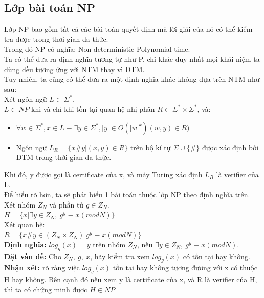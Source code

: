 \documentclass[a4paper 14pt]{article}
\begin{document}
		\subsection{Lớp bài toán NP}
			Lớp NP bao gồm tất cả các bài toán quyết định mà lời giải của nó có thể kiểm tra được trong thơi gian đa thức.\\
			Trong đó NP có nghĩa: Non-deterministic Polynomial time.\\
			Ta có thể đưa ra định nghĩa tương tự như P, chỉ khác duy nhất mọi khái niệm ta dùng đều tương ứng với NTM thay vì DTM.\\
			Tuy nhiên, ta cũng có thể đưa ra một định nghĩa khác không dựa trên NTM như sau:\\
			Xét ngôn ngữ $L \subset \Sigma^{*}$.\\
			$L \subset NP$ khi và chỉ khi tồn tại quan hệ nhị phân $R \subset \Sigma^{*} \times \Sigma^{*}$, và:
			\begin{itemize}
				\item $\forall w \in \Sigma^{*}, x \in L \equiv \exists y \in \Sigma^{*}, |y| \in O(|w|^k) (w,y) \in R)$
				\item Ngôn ngữ $L_R = \{x\#y| (x,y) \in R\}$ trên bộ kí tự $\Sigma \cup \{\#\}$ được xác định bởi DTM trong thời gian đa thức.
			\end{itemize}
			Khi đó, y được gọi là certificate của x, và máy Turing xác định $L_R$ là verifier của L.\\
			\vspace{0.5cm}
			Để hiểu rõ hơn, ta sẽ phát biểu 1 bài toán thuộc lớp NP theo định nghĩa trên.\\
			Xét nhóm $Z_N$ và phần tử  $g \in Z_N$. \\
			$H = \{x | \exists y \in Z_N,~ g^y \equiv x (mod N)\}$\\
			Xét quan hệ:\\
			$R = \{x\#y \in (Z_N\times Z_N)| g^y \equiv x (mod N)\}$\\
			\textbf{Định nghĩa:} $log_g(x) = y$ trên nhóm $Z_N$, nếu  $\exists y \in Z_N,~ g^y \equiv x (mod N)$.\\
			\textbf{Đặt vấn đề:} Cho $Z_N,~g,~x$, hãy kiểm tra xem $log_g(x)$ có tồn tại hay không.\\
			\textbf{Nhận xét:} rõ ràng việc $log_g(x)$ tồn tại hay không tương đương với x có thuộc H hay không. Bên cạnh đó nếu xem y là certificate của x, và R là verifier của H, thì ta có chứng minh được $H \in NP$\\
			\vspace{0.5cm}
			
\end{document}
